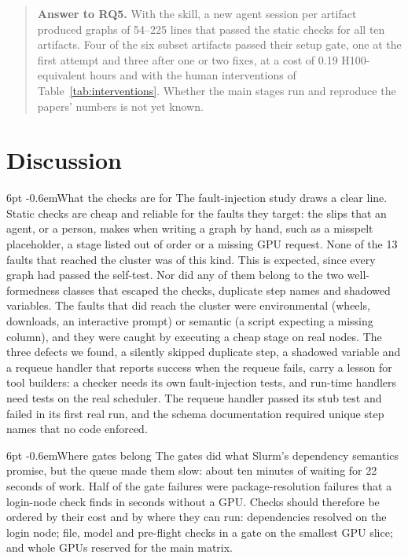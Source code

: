 \documentclass[pdflatex,sn-mathphys-num]{sn-jnl}
\makeatletter
\theoremstyle{thmstyletwo}%
\theoremstyle{thmstylethree}%
\newcommand{\RQ}[1]{\textbf{RQ#1}}
\renewcommand\paragraph{\@startsection{paragraph}{4}{\z@}%
  {6pt \@plus 2pt \@minus 1pt}{-0.6em}{\normalfont\normalsize\bfseries}}
\makeatother
\begin{document}
\begin{quote}\small\textbf{Answer to \RQ{5}.} With the skill, a new agent session per artifact produced graphs of 54--225 lines that passed the static checks for all ten artifacts. Four of the six subset artifacts passed their setup gate, one at the first attempt and three after one or two fixes, at a cost of 0.19 H100-equivalent hours and with the human interventions of Table~\ref{tab:interventions}. Whether the main stages run and reproduce the papers' numbers is not yet known.\end{quote}

\section{Discussion}\label{sec:discussion}

\paragraph{What the checks are for} The fault-injection study draws a clear line. Static checks are cheap and reliable for the faults they target: the slips that an agent, or a person, makes when writing a graph by hand, such as a misspelt placeholder, a stage listed out of order or a missing GPU request. None of the 13 faults that reached the cluster was of this kind. This is expected, since every graph had passed the self-test. Nor did any of them belong to the two well-formedness classes that escaped the checks, duplicate step names and shadowed variables. The faults that did reach the cluster were environmental (wheels, downloads, an interactive prompt) or semantic (a script expecting a missing column), and they were caught by executing a cheap stage on real nodes. The three defects we found, a silently skipped duplicate step, a shadowed variable and a requeue handler that reports success when the requeue fails, carry a lesson for tool builders: a checker needs its own fault-injection tests, and run-time handlers need tests on the real scheduler. The requeue handler passed its stub test and failed in its first real run, and the schema documentation required unique step names that no code enforced.

\paragraph{Where gates belong} The gates did what Slurm's dependency semantics promise, but the queue made them slow: about ten minutes of waiting for 22 seconds of work. Half of the gate failures were package-resolution failures that a login-node check finds in seconds without a GPU. Checks should therefore be ordered by their cost and by where they can run: dependencies resolved on the login node; file, model and pre-flight checks in a gate on the smallest GPU slice; and whole GPUs reserved for the main matrix.
\end{document}
